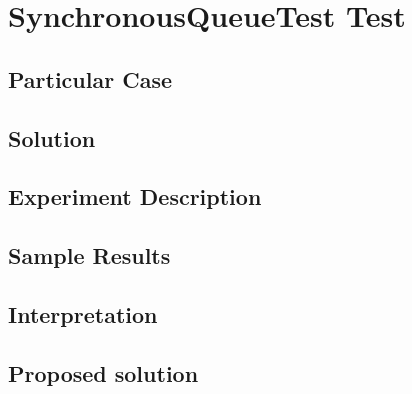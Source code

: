 \section{\textbf{SynchronousQueueTest Test}}
\subsection{Particular Case}
\par
\par
\subsection{Solution}
\par
\par
\subsection{Experiment Description}
\par
\par
\subsection{Sample Results}
\par
\par
\subsection{Interpretation}
\par
\par
\subsection{Proposed solution}
\par
\par
